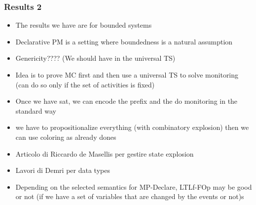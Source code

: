 \documentclass{beamer}
\begin{document}

\begin{frame}
\frametitle{Results 2}

\begin{itemize}
	\item The results we have are for bounded systems
	\item Declarative PM is a setting where boundedness is a natural assumption
	\item Genericity???? (We should have in the universal TS)
	\item Idea is to prove MC first and then use a universal TS to solve monitoring
		(can do so only if the set of activities is fixed)
	\item Once we have sat, we can encode the prefix and the do monitoring in the standard way
	\item we have to propositionalize everything (with combinatory explosion) then we can use coloring as 
	already dones
	\item Articolo di Riccardo de Masellis per gestire state explosion
	\item Lavori di Demri per data types
	\item Depending on the selected semantics for MP-Declare, LTLf-FOp may be 
		good or not (if we have a set of variables that are changed by the events or not)s
\end{itemize}

\end{frame}

\end{document}
